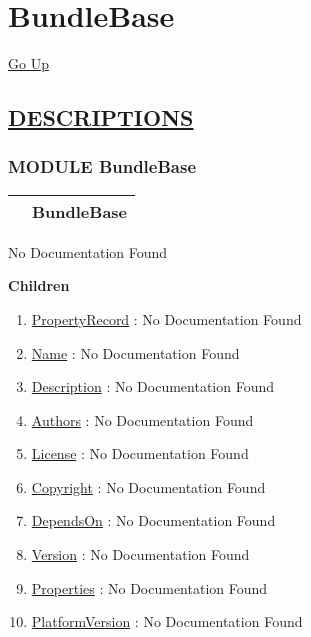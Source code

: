 \chapter*{\color{headfile}
BundleBase
}
\hypertarget{ecldoc:toc:BundleBase}{}
\hyperlink{ecldoc:toc:root}{Go Up}


\section*{\underline{\textsf{DESCRIPTIONS}}}
\subsection*{\textsf{\colorbox{headtoc}{\color{white} MODULE}
BundleBase}}

\hypertarget{ecldoc:BundleBase}{}

{\renewcommand{\arraystretch}{1.5}
\begin{tabularx}{\textwidth}{|>{\raggedright\arraybackslash}l|X|}
\hline
\hspace{0pt}\mytexttt{\color{red} } & \textbf{BundleBase} \\
\hline
\end{tabularx}
}

\par





No Documentation Found







\textbf{Children}
\begin{enumerate}
\item \hyperlink{ecldoc:bundlebase.propertyrecord}{PropertyRecord}
: No Documentation Found
\item \hyperlink{ecldoc:bundlebase.name}{Name}
: No Documentation Found
\item \hyperlink{ecldoc:bundlebase.description}{Description}
: No Documentation Found
\item \hyperlink{ecldoc:bundlebase.authors}{Authors}
: No Documentation Found
\item \hyperlink{ecldoc:bundlebase.license}{License}
: No Documentation Found
\item \hyperlink{ecldoc:bundlebase.copyright}{Copyright}
: No Documentation Found
\item \hyperlink{ecldoc:bundlebase.dependson}{DependsOn}
: No Documentation Found
\item \hyperlink{ecldoc:bundlebase.version}{Version}
: No Documentation Found
\item \hyperlink{ecldoc:bundlebase.properties}{Properties}
: No Documentation Found
\item \hyperlink{ecldoc:bundlebase.platformversion}{PlatformVersion}
: No Documentation Found
\end{enumerate}

